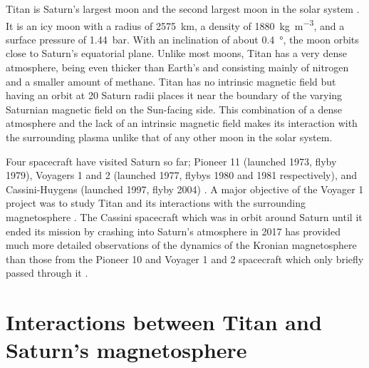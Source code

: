 \documentclass[12pt, parskip=full*, abstract]{scrartcl}
\begin{document}
Titan is Saturn's largest moon and the second largest moon in the solar system \parencite{fundamental-planetary-science}. It is an icy moon with a radius of \SI{2575}{\kilo\metre}, a density of \SI{1880}{\kilogram\per\metre^3}, and a surface pressure of \SI{1.44}{\bar}. With an inclination of about \SI{0.4}{\degree}, the moon orbits close to Saturn's equatorial plane. Unlike most moons, Titan has a very dense atmosphere, being even thicker than Earth's and consisting mainly of nitrogen and a smaller amount of methane. Titan has no intrinsic magnetic field but having an orbit at 20 Saturn radii places it near the boundary of the varying Saturnian magnetic field on the Sun-facing side. This combination of a dense atmosphere and the lack of an intrinsic magnetic field makes its interaction with the surrounding plasma unlike that of any other moon in the solar system. 

Four spacecraft have visited Saturn so far; Pioneer 11 (launched 1973, flyby 1979), Voyagers 1 and 2 (launched 1977, flybys 1980 and 1981 respectively), and Cassini-Huygens (launched 1997, flyby 2004) \parencite{encyclopedia-missions}. A major objective of the Voyager 1 project was to study Titan and its interactions with the surrounding magnetosphere \parencite{hartle-1982}. The Cassini spacecraft which was in orbit around Saturn until it ended its mission by crashing into Saturn's atmosphere in 2017 \parencite{cassini-2019} has provided much more detailed observations of the dynamics of the Kronian magnetosphere than those from the Pioneer 10 and Voyager 1 and 2 spacecraft which only briefly passed through it \parencite{encyclopedia-magnetospheres}. 


\section{Interactions between Titan and Saturn's magnetosphere}
\end{document}
